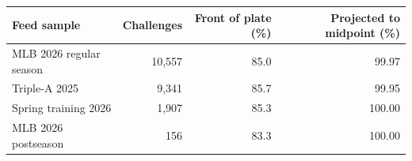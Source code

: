 \begin{tabular}{lrrr}
\toprule
Feed sample & Challenges & Front of plate (\%) & Projected to midpoint (\%) \\
\midrule
MLB 2026 regular season & 10{,}557 & 85.0 & 99.97 \\
Triple-A 2025 & 9{,}341 & 85.7 & 99.95 \\
Spring training 2026 & 1{,}907 & 85.3 & 100.00 \\
MLB 2026 postseason & 156 & 83.3 & 100.00 \\
\bottomrule
\end{tabular}
